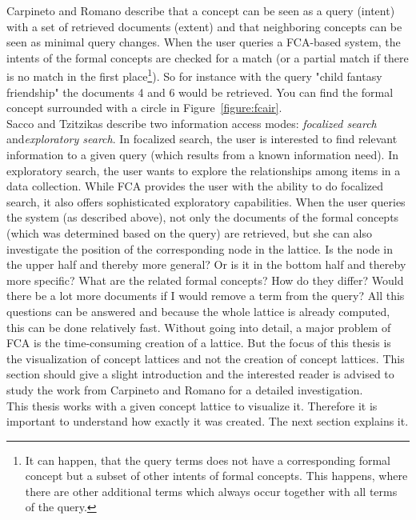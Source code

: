 \documentclass[11pt]{report}
\begin{document}
Carpineto and Romano \cite{Carpineto2005} describe that a concept can be seen as a query (intent) with a set of retrieved documents (extent) and that neighboring concepts can be seen as minimal query changes. When the user queries a FCA-based system, the intents of the formal concepts are checked for a match (or a partial match if there is no match in the first place\footnote{It can happen, that the query terms does not have a corresponding formal concept but a subset of other intents of formal concepts. This happens, where there are other additional terms which always occur together with all terms of the query.}). So for instance with the query "child fantasy friendship" the documents 4 and 6 would be retrieved. You can find the formal concept surrounded with a circle in Figure~\ref{figure:fcair}.\\

Sacco and Tzitzikas \cite{Sacco2009} describe two information access modes: \textit{focalized search} and\textit{exploratory search}. In focalized search, the user is interested to find relevant information to a given query (which results from a known information need). In exploratory search, the user wants to explore the relationships among items in a data collection. While FCA provides the user with the ability to do focalized search, it also offers sophisticated exploratory capabilities. When the user queries the system (as described above), not only the documents of the formal concepts (which was determined based on the query) are retrieved, but she can also investigate the position of the corresponding node in the lattice. Is the node in the upper half and thereby more general? Or is it in the bottom half and thereby more specific? What are the related formal concepts? How do they differ? Would there be a lot more documents if I would remove a term from the query? All this questions can be answered and because the whole lattice is already computed, this can be done relatively fast. Without going into detail, a major problem of FCA is the time-consuming creation of a lattice. But the focus of this thesis is the visualization of concept lattices and not the creation of concept lattices. This section should give a slight introduction and the interested reader is advised to study the work from Carpineto and Romano \cite{carpineto2004concept} for a detailed investigation. \\

This thesis works with a given concept lattice to visualize it. Therefore it is important to understand how exactly it was created. The next section explains it.
\end{document}
